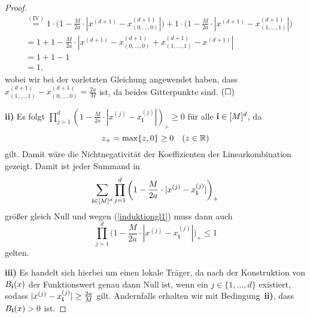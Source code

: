 \begin{proof}
\begin{equation*}
\begin{split}
& \stackrel{(\text{IV})}{=} 1 \cdot \bigg(1 - \frac{M}{2a} \cdot |x^{(d + 1)} - x_{(0,\dots,0)}^{(d + 1)}|\bigg) + 1 \cdot \bigg(1 - \frac{M}{2a} \cdot |x^{(d + 1)} - x_{(1,\dots,1)}^{(d + 1)}|\bigg) \\
& = 1 + 1 - \frac{M}{2a} \cdot |x^{(d + 1)} - x_{(0,\dots,0)}^{(d + 1)} + x_{(1,\dots,1)}^{(d + 1)} - x^{(d + 1)}| \\
& = 1 + 1 - 1 \\
& = 1,
\end{split}
\end{equation*}
wobei wir bei der vorletzten Gleichung angewendet haben, dass $x_{(1,\dots,1)}^{(d + 1)} - x_{(0,\dots,0)}^{(d + 1)} = \frac{2a}{M}$ ist, da beides Gitterpunkte sind.  $\hfill(\square)$ 		

\textbf{ii)} Es folgt $\prod_{j = 1}^d (1 - \frac{M}{2a} \cdot |x^{(j)} - x_{\mathbf{i}}^{(j)}|)_+ \geq 0$ für alle $\mathbf{i} \in [M]^d$, da $$z_+= \max\{z, 0\} \geq 0 \quad (z \in \mathbb{R})$$ gilt. Damit wäre die Nichtnegativität der Koeffizienten der Linearkombination gezeigt. Damit ist jeder Summand in $$\sum_{\mathbf{i} \in [M]^d} \prod_{j = 1}^d \bigg(1 - \frac{M}{2a} \cdot |x^{(j)} - x_{\mathbf{i}}^{(j)}|\bigg)_+$$ größer gleich Null und wegen (\ref{induktiongl1}) muss dann auch 
\begin{equation}
\label{induktiongl2}
\prod_{j = 1}^d \bigg(1 - \frac{M}{2a} \cdot |x^{(j)} - x_{\mathbf{i}}^{(j)}|\bigg)_+ \leq 1
\end{equation}
gelten.

\textbf{iii)} Es handelt sich hierbei um einen lokale Träger, da nach der Konstruktion von $B_{\mathbf{i}}(x)$ der Funktionswert genau dann Null ist, wenn ein $j \in \{1,\dots, d\}$ existiert, sodass $|x^{(j)} - x_{\mathbf{i}}^{(j)}| \geq \frac{2a}{M}$ gilt. Andernfalls erhalten wir mit Bedingung~\textbf{ii)}, dass $B_{\mathbf{i}}(x) > 0$ ist. 
\end{proof}

